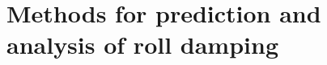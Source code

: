 \section{Methods for prediction and analysis of roll damping}
\label{se:methods_for_prediction_and_analysis}
